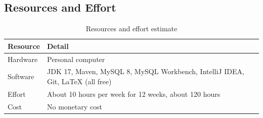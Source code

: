 \documentclass[11pt,a4paper]{article}
\begin{document}
\subsection{Resources and Effort}
\begin{table}[H]
\centering
\caption{Resources and effort estimate}
\begin{tabularx}{\textwidth}{lY}
\toprule
\textbf{Resource} & \textbf{Detail}\\
\midrule
Hardware & Personal computer\\
Software & JDK 17, Maven, MySQL 8, MySQL Workbench, IntelliJ IDEA, Git, LaTeX (all free)\\
Effort & About 10 hours per week for 12 weeks, about 120 hours\\
Cost & No monetary cost\\
\bottomrule
\end{tabularx}
\end{table}
\end{document}
